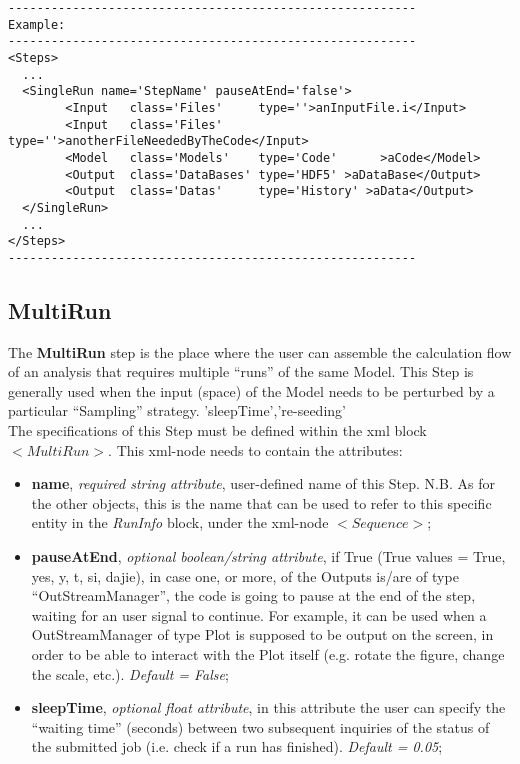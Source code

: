\begin{lstlisting}[style=XML]
---------------------------------------------------------
Example:
---------------------------------------------------------
<Steps>
  ...
  <SingleRun name='StepName' pauseAtEnd='false'> 
        <Input   class='Files'     type=''>anInputFile.i</Input>
        <Input   class='Files'     type=''>anotherFileNeededByTheCode</Input>
        <Model   class='Models'    type='Code'      >aCode</Model>
        <Output  class='DataBases' type='HDF5' >aDataBase</Output>
        <Output  class='Datas'     type='History' >aData</Output>
  </SingleRun>
  ...
</Steps>
---------------------------------------------------------
\end{lstlisting}
\subsection{MultiRun}
\label{subsec:stepMultiRun}
The  \textbf{MultiRun} step is the place where the user can assemble the calculation flow of an analysis that  requires multiple ``runs'' of the same Model. This Step is generally used when the input (space) of the Model needs to be perturbed by a particular ``Sampling'' strategy.
'sleepTime','re-seeding'
\\ The specifications of this Step must be defined within the xml block $<MultiRun>$. This xml-node needs to contain the attributes:
\vspace{-5mm}
\begin{itemize}
\itemsep0em
\item \textbf{name}, \textit{required string attribute}, user-defined name of this Step. N.B. As for the other objects, this is the name that can be used to refer to this specific entity in the \textit{RunInfo} block, under the xml-node $<Sequence>$;
\item \textbf{pauseAtEnd}, \textit{optional boolean/string attribute}, if True (True values = True, yes, y, t, si, dajie), in case one, or more, of the Outputs is/are of type ``OutStreamManager'', the code is going to pause at the end of the step, waiting for an user signal to continue. For example, it can be used when a OutStreamManager of type Plot is supposed to be output on the screen, in order to be able to interact with the Plot itself (e.g. rotate the figure, change the scale, etc.).  \textit{Default = False};
\item \textbf{sleepTime}, \textit{optional float attribute}, in this attribute the user can specify the ``waiting time'' (seconds) between two subsequent  inquiries of the status of the submitted job (i.e. check if a run has finished).  \textit{Default = 0.05};
\end{itemize}
